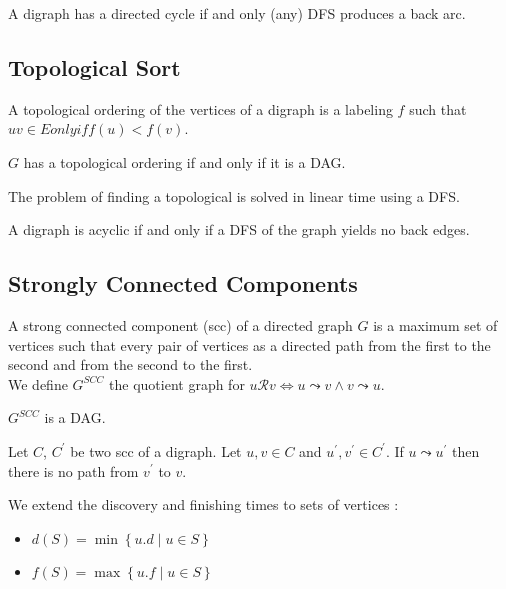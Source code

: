 \documentclass[12pt]{cours}
\begin{document}
\begin{proposition}
    A digraph has a directed cycle if and only (any) DFS produces a back arc.
\end{proposition}

\subsection{Topological Sort}
\begin{definition}
    A topological ordering of the vertices of a digraph is a labeling $f$ such that $uv \in E only if f(u) < f(v)$.
\end{definition}

\begin{theorem}
    $G$ has a topological ordering if and only if it is a DAG.
\end{theorem}

\begin{theorem}
    The problem of finding a topological is solved in linear time using a DFS.
\end{theorem}

\begin{lemma}
    A digraph is acyclic if and only if a DFS of the graph yields no back edges.
\end{lemma}

\subsection{Strongly Connected Components}
\begin{definition}
    A strong connected component (scc) of a directed graph $G$ is a maximum set of vertices such that every pair of vertices as a directed path from the first to the second and from the second to the first. \\ We define $G^{SCC}$ the quotient graph for $u \mathcal{R} v \Leftrightarrow u \leadsto v \wedge v \leadsto u$.
\end{definition}

\begin{proposition}
    $G^{SCC}$ is a DAG.
\end{proposition}

\begin{lemma}
    Let $C$, $C^{'}$ be two scc of a digraph. Let $u, v \in C$ and $u^{'}, v^{'} \in C^{'}$. If $u \leadsto u^{'}$ then there is no path from $v^{'}$ to $v$.
\end{lemma}

\begin{definition}
    We extend the discovery and finishing times to sets of vertices :
    \begin{itemize}
        \item $d(S) = \min \left\{u.d \mid u \in S\right\}$
        \item $f(S) = \max \left\{u.f \mid u \in S \right\}$
    \end{itemize}
\end{definition}
\end{document}
